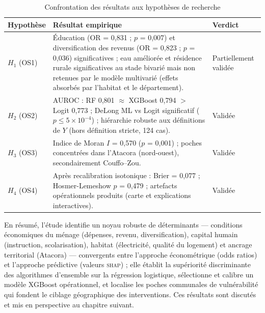 \begin{table}[H]
\centering
\caption{Confrontation des résultats aux hypothèses de recherche}
\label{tab:res-hypotheses}
\begin{tabular}{p{}p{}p{}}
\toprule
\textbf{Hypothèse} & \textbf{Résultat empirique} & \textbf{Verdict} \\
\midrule
$H_1$ (OS1) & Éducation (OR = 0,831 ; $p$ = 0,007) et diversification des
revenus (OR = 0,823 ; $p$ = 0,036) significatives ; eau améliorée et résidence
rurale significatives au stade bivarié mais non retenues par le modèle
multivarié (effets absorbés par l'habitat et le département). &
Partiellement validée \\
\addlinespace
$H_2$ (OS2) & AUROC : RF 0,801 $\approx$ XGBoost 0,794 $>$ Logit 0,773 ;
DeLong ML vs Logit significatif ($p \leq 5\times10^{-4}$) ; hiérarchie robuste
aux définitions de $Y$ (hors définition stricte, 124 cas). & Validée \\
\addlinespace
$H_3$ (OS3) & Indice de Moran $I$ = 0,570 ($p$ = 0,001) ; poches concentrées
dans l'Atacora (nord-ouest), secondairement Couffo--Zou. & Validée \\
\addlinespace
$H_4$ (OS4) & Après recalibration isotonique : Brier = 0,077 ;
Hosmer-Lemeshow $p$ = 0,479 ; artefacts opérationnels produits (carte et
explications interactives). & Validée \\
\bottomrule
\end{tabular}
\end{table}

En résumé, l'étude identifie un noyau robuste de déterminants — conditions
économiques du ménage (dépenses, revenu, diversification), capital humain
(instruction, scolarisation), habitat (électricité, qualité du logement) et
ancrage territorial (Atacora) — convergents entre l'approche économétrique
(odds ratios) et l'approche prédictive (valeurs \textsc{shap}) ; elle établit
la supériorité discriminante des algorithmes d'ensemble sur la régression
logistique, sélectionne et calibre un modèle XGBoost opérationnel, et localise
les poches communales de vulnérabilité qui fondent le ciblage géographique des
interventions. Ces résultats sont discutés et mis en perspective au chapitre
suivant.

